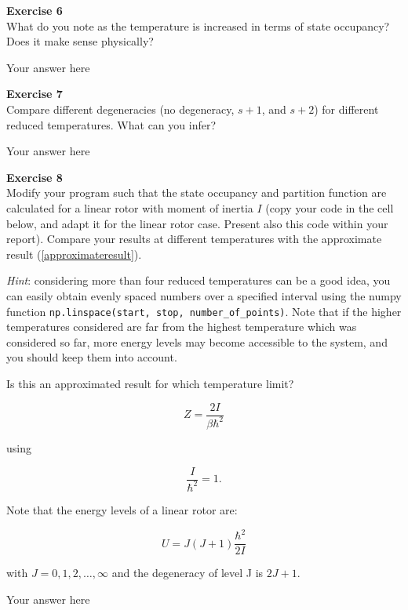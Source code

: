 \documentclass{article}
\begin{document}
\begin{mdframed}
\textbf{Exercise 6}\\
What do you note as the temperature is increased in terms of state occupancy? Does it make sense physically?
\end{mdframed}

Your answer here

\begin{mdframed}
\textbf{Exercise 7}\\
Compare different degeneracies (no degeneracy, $s+1$, and $s+2$) for different reduced temperatures. What can you infer?
\end{mdframed}

Your answer here

\begin{mdframed}
\textbf{Exercise 8}\\
Modify your program such that the state occupancy and partition
function are calculated for a linear rotor with moment of inertia $I$ (copy your code in the cell below, and adapt it for the linear rotor case. Present also this code within your report). Compare your results at different temperatures with the approximate result (\ref{approximateresult}).

\textit{Hint}: considering more than four reduced temperatures can be a good idea, you can easily obtain evenly spaced numbers over a specified interval using the numpy function \texttt{np.linspace(start, stop, number\_of\_points)}.
Note that if the higher temperatures considered are far from the highest temperature which was considered so far, more energy levels may become accessible to the system, and you should keep them into account.

Is this an approximated result for which temperature limit?

\begin{equation}
\label{approximateresult}
Z = \frac{2I}{\beta\hbar^2}
\end{equation}

using

\begin{equation}
\frac{I}{\hbar^2} = 1.
\end{equation}

Note that the energy levels of a linear rotor are:

\begin{equation}
U = J(J+1)\frac{\hbar^2}{2I}
\end{equation}

with $J= 0, 1, 2, \dots, \infty$ and the degeneracy of level J is $2J +1$.
\end{mdframed}

Your answer here
\end{document}
